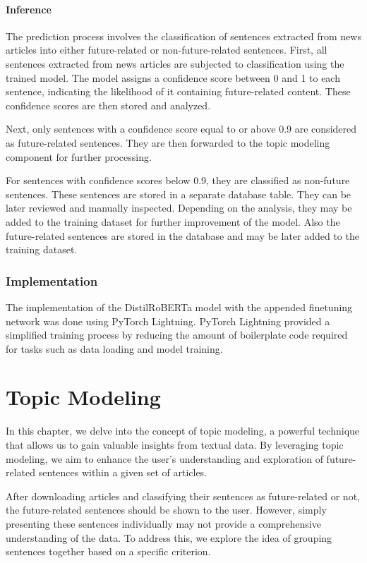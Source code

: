 \documentclass[a4paper,10pt]{report} %
\begin{document}
\subsubsection{Inference}
The prediction process involves the classification of sentences extracted from news articles into either future-related or non-future-related sentences.
First, all sentences extracted from news articles are subjected to classification using the trained model. The model assigns a confidence score between 0 and 1 to each sentence, indicating the likelihood of it containing future-related content. These confidence scores are then stored and analyzed.

Next, only sentences with a confidence score equal to or above 0.9 are considered as future-related sentences. They are then forwarded to the topic modeling component for further processing.

For sentences with confidence scores below 0.9, they are classified as non-future sentences. These sentences are stored in a separate database table. They can be later reviewed and manually inspected. Depending on the analysis, they may be added to the training dataset for further improvement of the model.
Also the future-related sentences are stored in the database and may be later added to the training dataset.

\subsection{Implementation}
The implementation of the DistilRoBERTa model with the appended finetuning network was done using PyTorch Lightning. PyTorch Lightning provided a simplified training process by reducing the amount of boilerplate code required for tasks such as data loading and model training.

\chapter{Topic Modeling}
In this chapter, we delve into the concept of topic modeling, a powerful technique that allows us to gain valuable insights from textual data. By leveraging topic modeling, we aim to enhance the user's understanding and exploration of future-related sentences within a given set of articles.

After downloading articles and classifying their sentences as future-related or not, the future-related sentences should be shown to the user. However, simply presenting these sentences individually may not provide a comprehensive understanding of the data. To address this, we explore the idea of grouping sentences together based on a specific criterion.
\end{document}
